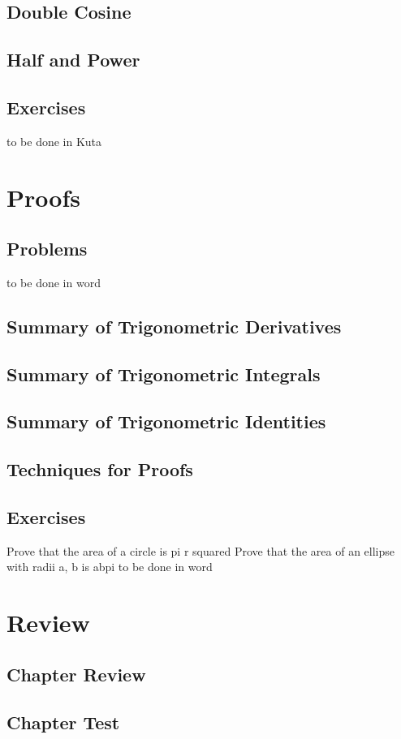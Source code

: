 \subsection{Double Cosine}
\subsection{Half and Power}
\newpage
\subsection{Exercises}
to be done in Kuta


\newpage
\section{Proofs}
\subsection{Problems}
to be done in word
\newpage
\subsection{Summary of Trigonometric Derivatives}
\subsection{Summary of Trigonometric Integrals}
\subsection{Summary of Trigonometric Identities}
\subsection{Techniques for Proofs}
\newpage
\subsection{Exercises}
Prove that the area of a circle is pi r squared
Prove that the area of an ellipse with radii a, b is abpi
to be done in word


\newpage
\section{Review}
\subsection{Chapter Review}
\subsection{Chapter Test}
